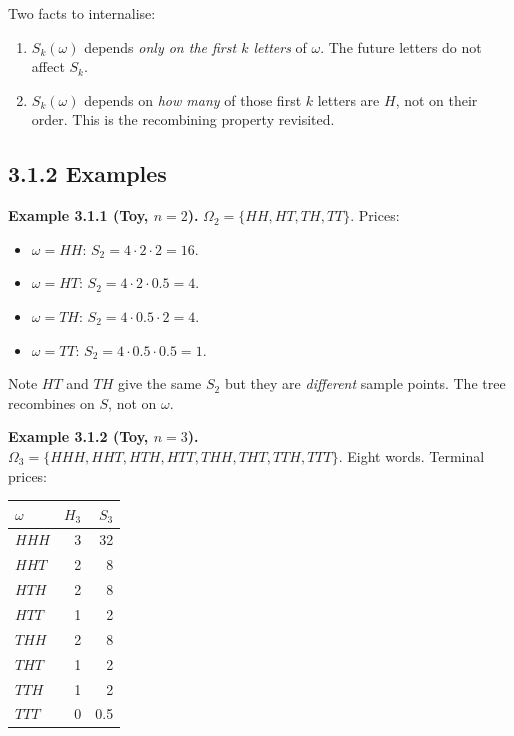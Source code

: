 \documentclass[
  10pt,
  twoside]{book}
\newcounter{none} %
\providecommand{\tightlist}{%
  \setlength{\itemsep}{0pt}\setlength{\parskip}{0pt}}
\begin{document}
Two facts to internalise:

\begin{enumerate}
\def\labelenumi{\arabic{enumi}.}
\tightlist
\item
  \(S_k(\omega)\) depends \emph{only on the first \(k\) letters} of
  \(\omega\). The future letters do not affect \(S_k\).
\item
  \(S_k(\omega)\) depends on \emph{how many} of those first \(k\)
  letters are \(H\), not on their order. This is the recombining
  property revisited.
\end{enumerate}

\subsection{3.1.2 Examples}\label{examples-11}

\textbf{Example 3.1.1 (Toy, \(n=2\)).}
\(\Omega_2 = \{HH, HT, TH, TT\}\). Prices:

\begin{itemize}
\tightlist
\item
  \(\omega = HH\): \(S_2 = 4 \cdot 2 \cdot 2 = 16\).
\item
  \(\omega = HT\): \(S_2 = 4 \cdot 2 \cdot 0.5 = 4\).
\item
  \(\omega = TH\): \(S_2 = 4 \cdot 0.5 \cdot 2 = 4\).
\item
  \(\omega = TT\): \(S_2 = 4 \cdot 0.5 \cdot 0.5 = 1\).
\end{itemize}

Note \(HT\) and \(TH\) give the same \(S_2\) but they are
\emph{different} sample points. The tree recombines on \(S\), not on
\(\omega\).

\textbf{Example 3.1.2 (Toy, \(n=3\)).}
\(\Omega_3 = \{HHH, HHT, HTH, HTT, THH, THT, TTH, TTT\}\). Eight words.
Terminal prices:

{\def\LTcaptype{none} %
\begin{table}[H]
\centering
\begin{tabular}{|l|r|r|}
\toprule
\(\omega\) & \(H_3\) & \(S_3\) \\
\midrule



\(HHH\) & 3 & 32 \\
\(HHT\) & 2 & 8 \\
\(HTH\) & 2 & 8 \\
\(HTT\) & 1 & 2 \\
\(THH\) & 2 & 8 \\
\(THT\) & 1 & 2 \\
\(TTH\) & 1 & 2 \\
\(TTT\) & 0 & 0.5 \\
\bottomrule
\end{tabular}
\end{table}
}
\end{document}
